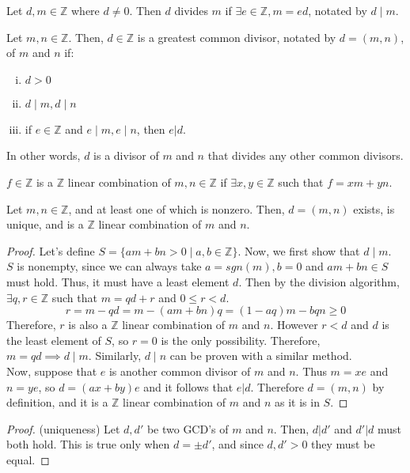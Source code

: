 \documentclass{article}
\begin{document}
\begin{definition}
Let $d,m\in\mathbb{Z}$ where $d\neq0$. Then $d$ divides $m$ if $\exists e\in\mathbb{Z}, m=ed$, notated by $d\mid m$.
\end{definition}
\begin{definition}
Let $m,n\in\mathbb{Z}$. Then, $d\in\mathbb{Z}$ is a greatest common divisor, notated by $d=(m,n)$, of $m$ and $n$ if: 
\begin{enumerate}[(i)]
	\item $d>0$
	\item $d\mid m, d\mid n$
	\item if $e\in\mathbb{Z}$ and $e\mid m, e\mid n$, then $e|d$. 
\end{enumerate}
In other words, $d$ is a divisor of $m$ and $n$ that divides any other common divisors. 
\end{definition}
\begin{definition}
$f\in\mathbb{Z}$ is a $\mathbb{Z}$ linear combination of $m,n\in\mathbb{Z}$ if $\exists x,y\in\mathbb{Z}$ such that $f=xm+yn$.
\end{definition}
\begin{theorem}
Let $m,n\in\mathbb{Z}$, and at least one of which is nonzero. Then, $d=(m,n)$ exists, is unique, and is a $\mathbb{Z}$ linear combination of $m$ and $n$. 
\end{theorem}
\begin{proof}
Let's define $S=\{am+bn>0\mid a,b\in\mathbb{Z}\}$. Now, we first show that $d\mid m$. \\
$S$ is nonempty, since we can always take $a=sgn(m),b=0$ and $am+bn\in S$ must hold. Thus, it must have a least element $d$. Then by the division algorithm, $\exists q,r\in\mathbb{Z}$ such that $m=qd+r$ and $0\leq r<d$.
$$r=m-qd=m-(am+bn)q=(1-aq)m-bqn\geq0$$
Therefore, $r$ is also a $\mathbb{Z}$ linear combination of $m$ and $n$. However $r<d$ and $d$ is the least element of $S$, so $r=0$ is the only possibility. Therefore, $m=qd\implies d\mid m$. Similarly, $d\mid n$ can be proven with a similar method. \\
Now, suppose that $e$ is another common divisor of $m$ and $n$. Thus $m=xe$ and $n=ye$, so $d=(ax+by)e$ and it follows that $e|d$. Therefore $d=(m,n)$ by definition, and it is a $\mathbb{Z}$ linear combination of $m$ and $n$ as it is in $S$. 
\end{proof}
\begin{proof}
(uniqueness) Let $d,d'$ be two GCD's of $m$ and $n$. Then, $d|d'$ and $d'|d$ must both hold. This is true only when $d=\pm d'$, and since $d,d'>0$ they must be equal. 
\end{proof}
\end{document}
